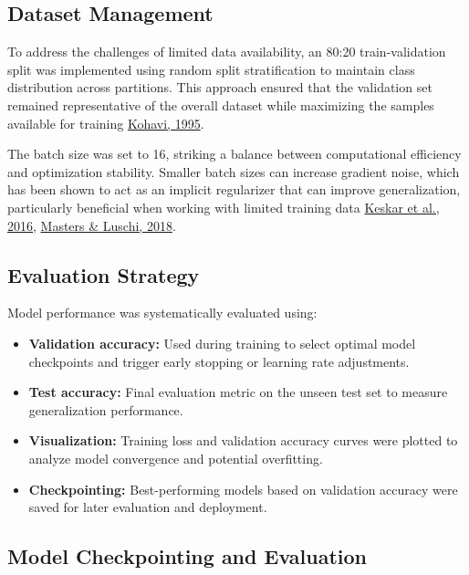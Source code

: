 \documentclass[a4paper,12pt]{report}
\begin{document}
\subsection{Dataset Management}

To address the challenges of limited data availability, an 80:20 train-validation split was implemented using random split stratification to maintain class distribution across partitions. This approach ensured that the validation set remained representative of the overall dataset while maximizing the samples available for training {\href{https://dl.acm.org/doi/10.5555/1643031.1643047}{Kohavi, 1995}}.

The batch size was set to 16, striking a balance between computational efficiency and optimization stability. Smaller batch sizes can increase gradient noise, which has been shown to act as an implicit regularizer that can improve generalization, particularly beneficial when working with limited training data {\href{https://arxiv.org/abs/1609.04836}{Keskar et al., 2016}, \href{https://arxiv.org/abs/1804.07612}{Masters \& Luschi, 2018}}.

\subsection{Evaluation Strategy}

Model performance was systematically evaluated using:

\begin{itemize}
    \item \textbf{Validation accuracy:} Used during training to select optimal model checkpoints and trigger early stopping or learning rate adjustments.
    \item \textbf{Test accuracy:} Final evaluation metric on the unseen test set to measure generalization performance.
    \item \textbf{Visualization:} Training loss and validation accuracy curves were plotted to analyze model convergence and potential overfitting.
    \item \textbf{Checkpointing:} Best-performing models based on validation accuracy were saved for later evaluation and deployment.
\end{itemize}

\subsection{Model Checkpointing and Evaluation}
\end{document}
